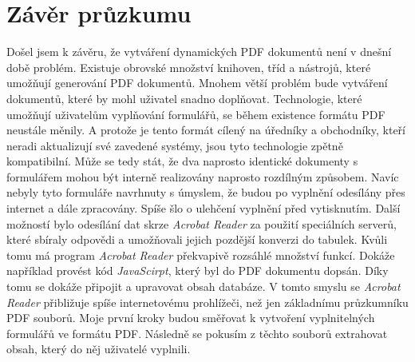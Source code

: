 \documentclass[czech,BP]{thesiskiv}
\begin{document}
\section{Závěr průzkumu}
Došel jsem k závěru, že vytváření dynamických PDF dokumentů není v dnešní době problém. Existuje obrovské množství knihoven, tříd a nástrojů, které umožňují generování PDF dokumentů. Mnohem větší problém bude vytváření dokumentů, které by mohl uživatel snadno doplňovat. Technologie, které umožňují uživatelům vyplňování formulářů, se během existence formátu PDF neustále měnily. A protože je tento formát cílený na úředníky a obchodníky, kteří neradi aktualizují své zavedené systémy, jsou tyto technologie zpětně kompatibilní. Může se tedy stát, že dva naprosto identické dokumenty s formulářem mohou být interně realizovány naprosto rozdílným způsobem. Navíc nebyly tyto formuláře navrhnuty s úmyslem, že budou po vyplnění odesílány přes internet a dále zpracovány. Spíše šlo o ulehčení vyplnění před vytisknutím. Další možností bylo odesílání dat skrze \emph{Acrobat Reader} za použití speciálních serverů, které sbíraly odpovědi a umožňovali jejich pozdější konverzi do tabulek. Kvůli tomu má program \emph{Acrobat Reader} překvapivě rozsáhlé množství funkcí. Dokáže například provést kód \emph{JavaScirpt}, který byl do PDF dokumentu dopsán. Díky tomu se dokáže připojit a upravovat obsah databáze. V tomto smyslu se \emph{Acrobat Reader} přibližuje spíše internetovému prohlížeči, než jen základnímu průzkumníku PDF souborů. Moje první kroky budou směřovat k vytvoření vyplnitelných formulářů ve formátu PDF. Následně se pokusím z těchto souborů extrahovat obsah, který do něj uživatelé vyplnili. 
\end{document}
